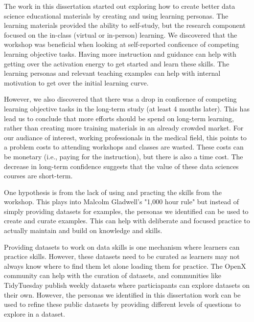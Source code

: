 \documentclass[doublespace,draft,nopageskip]{VTthesis} %
\begin{document}
        The work in this dissertation started out exploring how to create better data science educational materials
        by creating and using learning personas.
        The learning materials provided the ability to self-study,
        but the research component focused on the in-class (virtual or in-person) learning.
        We discovered that the workshop was beneficial when looking at self-reported conficence of competing learning objective tasks.
        Having more instruction and guidance can help with getting over the activation energy to get started and learn these skills.
        The learning personas and relevant teaching examples can help with internal motivation
        to get over the initial learning curve.

        However, we also discovered that there was a drop in conficence of competing learning objective tasks
        in the long-term study (at least 4 months later).
        This has lead us to conclude that more efforts should be spend on long-term learning,
        rather than creating more training materials in an already crowded market.
        For our audiance of interest, working professionals in the medical field,
        this points to a problem costs to attending workshops and classes are wasted.
        These costs can be monetary (i.e., paying for the instruction), but there is also a time cost.
        The decrease in long-term confidence suggests that the value of these data sciences courses are short-term.

        One hypothesis is from the lack of using and practing the skills from the workshop.
        This plays into Malcolm Gladwell's "1,000 hour rule" but instead of simply providing datasets for examples,
        the personas we identified can be used to create and curate examples.
        This can help with deliberate and focused practice to actually maintain and build on knowledge and skills.

        Providing datasets to work on data skills is one mechanism where learners can practice skills.
        However, these datasets need to be curated as learners may not always know where to find them let alone loading them for practice.
        The OpenX community can help with the curation of datasets,
        and communities like TidyTuesday publish weekly datasets where particiapants can explore datasets on their own.
        However, the personas we identified in this dissertation work can be used to refine these public datasets
        by providing different levels of questions to explore in a dataset.
\end{document}
